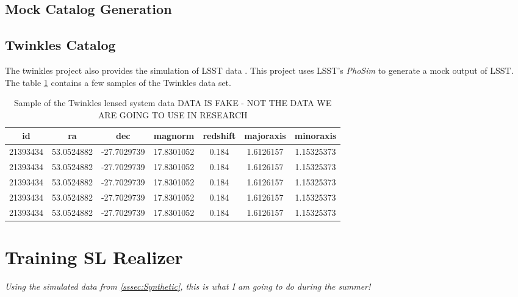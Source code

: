 \documentclass[\docopts]{\docclass}
\begin{document}
\subsection{Mock Catalog Generation}
\label{subsection:MCG}

\subsection{Twinkles Catalog}

The twinkles project also provides the simulation of LSST data \cite{Twinkles}. This project uses LSST's \textit{PhoSim} to generate a mock output of LSST. The table \ref{table:1} contains a few samples of the Twinkles data set.
 
\begin{table}[h!]
\centering
\begin{tabular}{||c c c c c c c||} 
 \hline
 id & ra & dec & magnorm & redshift & majoraxis & minoraxis   \\ [0.5ex] 
 \hline\hline
 21393434 & 53.0524882 & -27.7029739 & 17.8301052 & 0.184 & 1.6126157 & 1.15325373 \\ 
 21393434 & 53.0524882 & -27.7029739 & 17.8301052 & 0.184 & 1.6126157 & 1.15325373 \\
 21393434 & 53.0524882 & -27.7029739 & 17.8301052 & 0.184 & 1.6126157 & 1.15325373 \\
 21393434 & 53.0524882 & -27.7029739 & 17.8301052 & 0.184 & 1.6126157 & 1.15325373 \\
 21393434 & 53.0524882 & -27.7029739 & 17.8301052 & 0.184 & 1.6126157 & 1.15325373 \\ [1ex] 
 \hline
\end{tabular}
\caption{Sample of the Twinkles lensed system data DATA IS FAKE - NOT THE DATA WE ARE GOING TO USE IN RESEARCH}
\label{table:1}
\end{table}

\label{sec:catalog_generation}


\section{Training SL Realizer}
\label{sec:sl_realizer_train}

\textit{Using the simulated data from \ref{sssec:Synthetic}, this is what I am going to do during the summer! }

\end{document}
